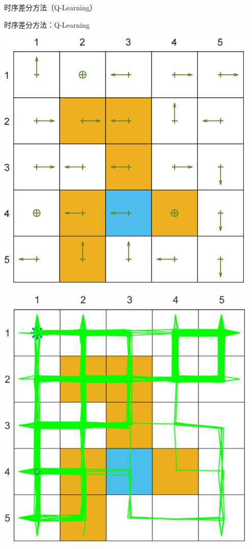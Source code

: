 \begin{section}{时序差分方法\alert{（Q-Learning）}}
\begin{frame}{时序差分方法：Q-Learning}
    \begin{center}
        \begin{minipage}{0.2\textwidth}
            \centering
            \includegraphics[width=\linewidth]{assets/e0.1policy2.jpg}
        \end{minipage}
        \hspace{1cm}
        \begin{minipage}{0.2\textwidth}
            \centering
            \includegraphics[width=\linewidth]{assets/e0.1episode2.jpg}

\end{minipage}
\end{center}
\end{frame}
\end{section}
